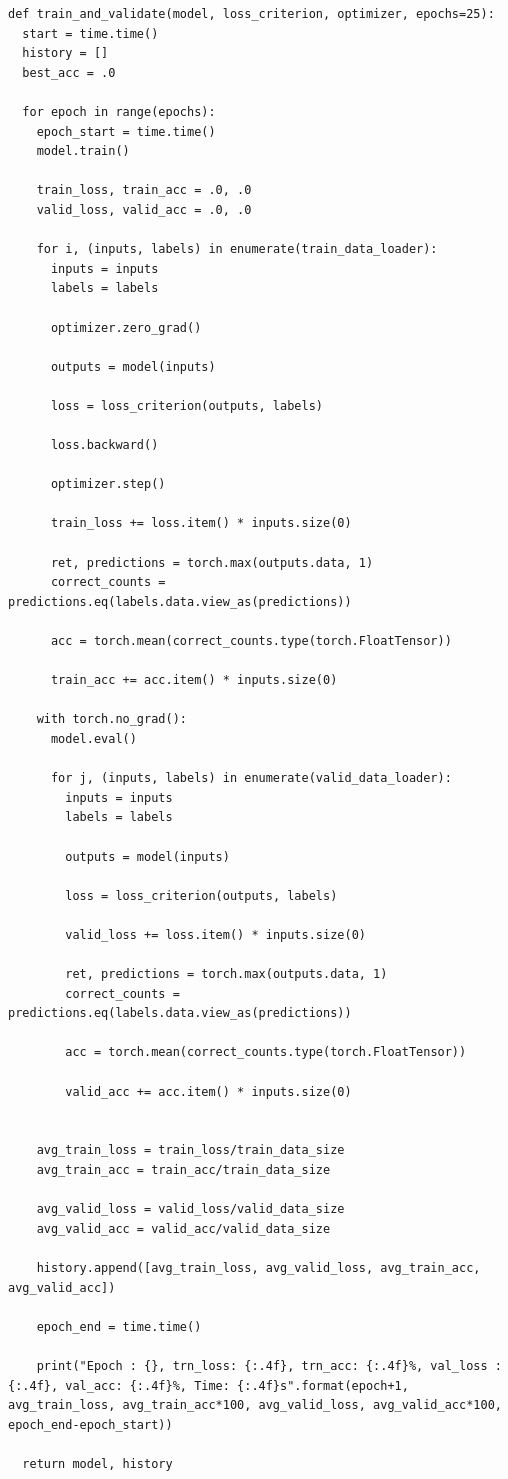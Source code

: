 \documentclass[a4paper]{article}
\begin{document}
\begin{lstlisting}
def train_and_validate(model, loss_criterion, optimizer, epochs=25):
  start = time.time()
  history = []
  best_acc = .0

  for epoch in range(epochs):
    epoch_start = time.time()
    model.train()

    train_loss, train_acc = .0, .0
    valid_loss, valid_acc = .0, .0
    
    for i, (inputs, labels) in enumerate(train_data_loader):
      inputs = inputs
      labels = labels
      
      optimizer.zero_grad()
      
      outputs = model(inputs)
      
      loss = loss_criterion(outputs, labels)
      
      loss.backward()
      
      optimizer.step()
      
      train_loss += loss.item() * inputs.size(0)
      
      ret, predictions = torch.max(outputs.data, 1)
      correct_counts = predictions.eq(labels.data.view_as(predictions))
      
      acc = torch.mean(correct_counts.type(torch.FloatTensor))
      
      train_acc += acc.item() * inputs.size(0)
        
    with torch.no_grad():
      model.eval()

      for j, (inputs, labels) in enumerate(valid_data_loader):
        inputs = inputs
        labels = labels

        outputs = model(inputs)

        loss = loss_criterion(outputs, labels)

        valid_loss += loss.item() * inputs.size(0)

        ret, predictions = torch.max(outputs.data, 1)
        correct_counts = predictions.eq(labels.data.view_as(predictions))

        acc = torch.mean(correct_counts.type(torch.FloatTensor))

        valid_acc += acc.item() * inputs.size(0)

        
    avg_train_loss = train_loss/train_data_size 
    avg_train_acc = train_acc/train_data_size

    avg_valid_loss = valid_loss/valid_data_size 
    avg_valid_acc = valid_acc/valid_data_size

    history.append([avg_train_loss, avg_valid_loss, avg_train_acc, avg_valid_acc])
            
    epoch_end = time.time()

    print("Epoch : {}, trn_loss: {:.4f}, trn_acc: {:.4f}%, val_loss : {:.4f}, val_acc: {:.4f}%, Time: {:.4f}s".format(epoch+1, avg_train_loss, avg_train_acc*100, avg_valid_loss, avg_valid_acc*100, epoch_end-epoch_start))
      
  return model, history
\end{lstlisting}
\end{document}
